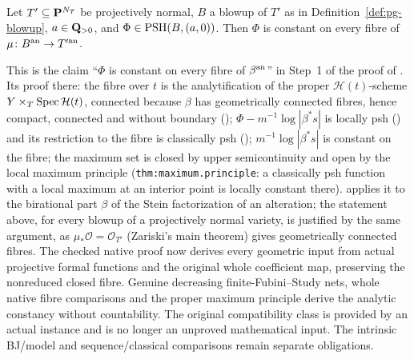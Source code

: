 \begin{theorem}\label{thm:gl-fibre-constancy}
\leanok
{}
Let $T'\subseteq\mathbf{P}^{N_T}$ be projectively normal, $B$ a blowup of $T'$ as in Definition~\ref{def:pg-blowup}, $a\in\mathbf{Q}_{>0}$, and
$\Phi\in\operatorname{PSH}(B,(a,0))$. Then $\Phi$ is constant on every fibre of $\mu\colon B^{\mathrm{an}}\to T'^{\mathrm{an}}$.
\end{theorem}

\begin{remark}\label{rmk:gl-fibre-constancy}
This is the claim ``$\Phi$ is constant on every fibre of $\beta^{\mathrm{an}}$'' in Step~1 of the proof of \cite[Theorem~6.1]{FHX}. Its proof there: the fibre over $t$ is
the analytification of the proper $\mathcal H(t)$-scheme $Y\times_T\operatorname{Spec}\mathcal H(t)$, connected because $\beta$ has geometrically connected fibres, hence
compact, connected and without boundary (\cite[\S\S3.4--3.5]{Berkovich90}); $\Phi-m^{-1}\log|\beta^*s|$ is locally psh (\cite[Lemma~5.4(2)]{FHX}) and
its restriction to the fibre is classically psh (\cite[Lemma~5.2(2),(4)]{FHX}); $m^{-1}\log|\beta^*s|$ is constant on the fibre; the maximum set is closed by
upper semicontinuity and open by the local maximum principle \cite[Theorem~6.1]{GR25} (\texttt{thm:maximum.principle}: a classically psh function with a
local maximum at an interior point is locally constant there). \cite{FHX} applies it to the birational part $\beta$ of the Stein factorization of an alteration;
the statement above, for every blowup of a projectively normal variety, is justified by the same argument, as $\mu_*\mathcal O=\mathcal O_{T'}$ (Zariski's main
theorem) gives geometrically connected fibres. The checked native proof now derives every
geometric input from actual projective formal functions and the original whole coefficient
map, preserving the nonreduced closed fibre. Genuine decreasing finite-Fubini--Study nets,
whole native fibre comparisons and the proper maximum principle derive the analytic
constancy without countability. The original compatibility class is provided by an actual
instance and is no longer an unproved mathematical input. The intrinsic BJ/model and
sequence/classical comparisons remain separate obligations.
\end{remark}

